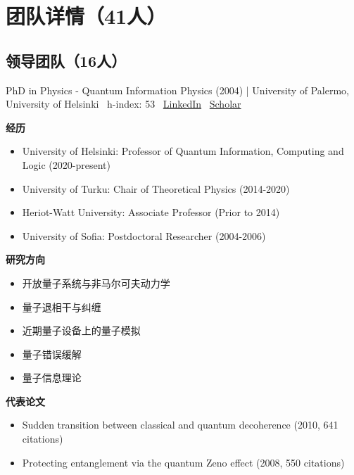 \section{团队详情（41人）}
\subsection{领导团队（16人）}
\vspace{4pt}
\par{\footnotesize\color{graytext}PhD in Physics - Quantum Information Physics (2004) | University of Palermo, University of Helsinki \textbar\  h-index: 53 \textbar\  \href{https://www.linkedin.com/in/sabrina-maniscalco-0402642/}{LinkedIn} \textbar\  \href{https://scholar.google.com/citations?user=EZ0GPwgAAAAJ}{Scholar}}
\par{\footnotesize\color{mainred}\textbf{经历}}
\begin{itemize}[leftmargin=1.2em,itemsep=0pt,topsep=0pt]
\item {\footnotesize University of Helsinki: Professor of Quantum Information, Computing and Logic (2020-present)}
\item {\footnotesize University of Turku: Chair of Theoretical Physics (2014-2020)}
\item {\footnotesize Heriot-Watt University: Associate Professor (Prior to 2014)}
\item {\footnotesize University of Sofia: Postdoctoral Researcher (2004-2006)}
\end{itemize}
\par{\footnotesize\color{mainred}\textbf{研究方向}}
\begin{itemize}[leftmargin=1.2em,itemsep=0pt,topsep=0pt]
\item {\footnotesize 开放量子系统与非马尔可夫动力学}
\item {\footnotesize 量子退相干与纠缠}
\item {\footnotesize 近期量子设备上的量子模拟}
\item {\footnotesize 量子错误缓解}
\item {\footnotesize 量子信息理论}
\end{itemize}
\par{\footnotesize\color{mainred}\textbf{代表论文}}
\begin{itemize}[leftmargin=1.2em,itemsep=0pt,topsep=0pt]
\item {\footnotesize Sudden transition between classical and quantum decoherence (2010, 641 citations)}
\item {\footnotesize Protecting entanglement via the quantum Zeno effect (2008, 550 citations)}
\end{itemize}
